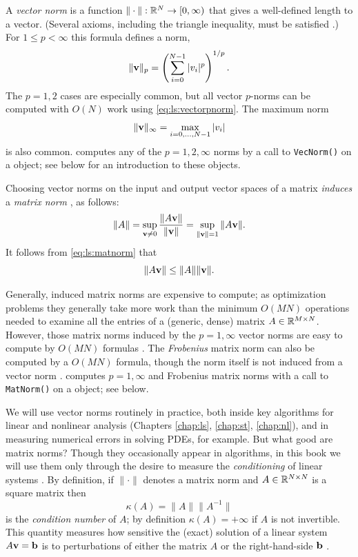 A \emph{vector norm} is a function $\|\cdot\|:\mathbb{R}^N \to [0,\infty)$ that gives a well-defined length to a vector.  (Several axioms, including the triangle inequality, must be satisfied \citep{TrefethenBau1997}.)  For $1 \le p < \infty$ this formula defines a norm,
\begin{equation}
\|\mathbf{v}\|_p = \left(\sum_{i=0}^{N-1} |v_i|^p\right)^{1/p}.  \label{eq:ls:vectorpnorm}
\end{equation}
The $p=1,2$ cases are especially common, but all vector $p$-norms can be computed with $O(N)$ work using \eqref{eq:ls:vectorpnorm}.  The maximum norm
\begin{equation}
\|\mathbf{v}\|_\infty = \max_{i=0,\dots,N-1} |v_i|  \label{eq:ls:vectorinfnorm}
\end{equation}
is also common.  \PETSc computes any of the $p=1,2,\infty$ norms by a call to \texttt{VecNorm()} on a \PETSc \pVec object; see below for an introduction to these objects.

Choosing vector norms on the input and output vector spaces of a matrix \emph{induces} a \emph{matrix norm} \citep{TrefethenBau1997}, as follows:
\begin{equation}
\|A\| = \sup_{\mathbf{v} \ne 0} \frac{\|A\mathbf{v}\|}{\|\mathbf{v}\|} = \sup_{\|\mathbf{v}\| = 1} \|A\mathbf{v}\|.  \label{eq:ls:matnorm}
\end{equation}
It follows from \eqref{eq:ls:matnorm} that
    $$\|A \mathbf{v}\| \le \|A\| \|\mathbf{v}\|.$$

Generally, induced matrix norms are expensive to compute; as optimization problems they generally take more work than the minimum $O(MN)$ operations needed to examine all the entries of a (generic, dense) matrix $A\in \mathbb{R}^{M\times N}$.  However, those matrix norms induced by the $p=1,\infty$ vector norms are easy to compute by $O(MN)$ formulas \citep{TrefethenBau1997}.  The \emph{Frobenius} matrix norm can also be computed by a $O(MN)$ formula, though the norm itself is not induced from a vector norm \citep{TrefethenBau1997}.  \PETSc computes $p=1,\infty$ and Frobenius matrix norms with a call to \texttt{MatNorm()} on a \PETSc \pMat object; see below.

We will use vector norms routinely in practice, both inside key algorithms for linear and nonlinear analysis (Chapters \ref{chap:ls}, \ref{chap:st}, \ref{chap:nl}), and in measuring numerical errors in solving PDEs, for example.   But what good are matrix norms?  Though they occasionally appear in algorithms, in this book we will use them only through the desire to measure the \emph{conditioning} of linear systems \citep{TrefethenBau1997}.  By definition, if $\|\cdot\|$ denotes a matrix norm and $A \in \mathbb{R}^{N\times N}$ is a square matrix then
\begin{equation}
    \kappa(A) = \|A\| \|A^{-1}\|  \label{eq:ls:conddefn}
\end{equation}
is the \emph{condition number} of $A$; by definition $\kappa(A)=+\infty$ if $A$ is not invertible.  This quantity measures how sensitive the (exact) solution of a linear system $A \mathbf{v} = \mathbf{b}$ is to perturbations of either the matrix $A$ or the right-hand-side $\mathbf{b}$ \citep{TrefethenBau1997}.


